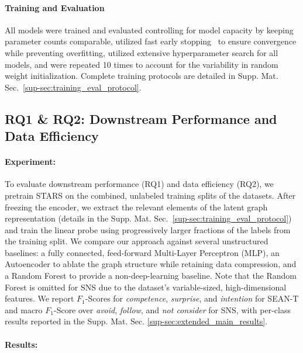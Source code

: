 \documentclass{article}
\newcommand{\method}{STARS\xspace}
\begin{document}
\paragraph{Training and Evaluation}
All models were trained and evaluated controlling for model capacity by keeping parameter counts comparable, utilized fast early stopping~\cite{prechelt2002early} to ensure convergence while preventing overfitting, utilized extensive hyperparameter search for all models, and were repeated 10 times to account for the variability in random weight initialization.
Complete training protocols are detailed in Supp. Mat. Sec.~\ref{sup-sec:training_eval_protocol}.


\subsection{RQ1 \& RQ2: Downstream Performance and Data Efficiency}
\label{sec:downstream_efficiency}

\paragraph{Experiment:}

To evaluate downstream performance (RQ1) and data efficiency (RQ2), we pretrain \method on the combined, unlabeled training splits of the datasets.
After freezing the encoder, we extract the relevant elements of the latent graph representation (details in the Supp. Mat. Sec.~\ref{sup-sec:training_eval_protocol}) and train the linear probe using progressively larger fractions of the labels from the training split.
We compare our approach against several unstructured baselines: a fully connected, feed-forward Multi-Layer Perceptron (MLP), an Autoencoder to ablate the graph structure while retaining data compression, and a Random Forest to provide a non-deep-learning baseline.
Note that the Random Forest is omitted for SNS due to the dataset's variable-sized, high-dimensional features.
We report $F_1$-Scores for \textit{competence}, \textit{surprise}, and \textit{intention} for SEAN-T and macro $F_1$-Score over \textit{avoid}, \textit{follow}, and \textit{not consider} for SNS, with per-class results reported in the Supp. Mat. Sec. \ref{sup-sec:extended_main_results}.


\paragraph{Results:}
\end{document}
